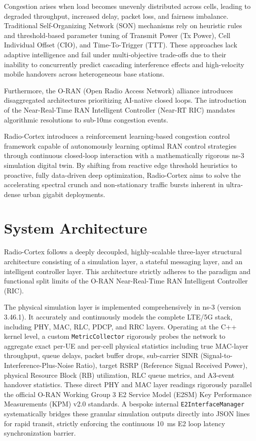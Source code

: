 \documentclass[12pt,a4paper]{article}
\begin{document}
Congestion arises when load becomes unevenly distributed across cells, leading to degraded throughput, increased delay, packet loss, and fairness imbalance. Traditional Self-Organizing Network (SON) mechanisms rely on heuristic rules and threshold-based parameter tuning of Transmit Power (Tx Power), Cell Individual Offset (CIO), and Time-To-Trigger (TTT). These approaches lack adaptive intelligence and fail under multi-objective trade-offs due to their inability to concurrently predict cascading interference effects and high-velocity mobile handovers across heterogeneous base stations. 

Furthermore, the O-RAN (Open Radio Access Network) alliance introduces disaggregated architectures prioritizing AI-native closed loops. The introduction of the Near-Real-Time RAN Intelligent Controller (Near-RT RIC) mandates algorithmic resolutions to sub-10ms congestion events. 

Radio-Cortex introduces a reinforcement learning-based congestion control framework capable of autonomously learning optimal RAN control strategies through continuous closed-loop interaction with a mathematically rigorous ns-3 simulation digital twin. By shifting from reactive edge threshold heuristics to proactive, fully data-driven deep optimization, Radio-Cortex aims to solve the accelerating spectral crunch and non-stationary traffic bursts inherent in ultra-dense urban gigabit deployments.

\section{System Architecture}

Radio-Cortex follows a deeply decoupled, highly-scalable three-layer structural architecture consisting of a simulation layer, a stateful messaging layer, and an intelligent controller layer. This architecture strictly adheres to the paradigm and functional split limits of the O-RAN Near-Real-Time RAN Intelligent Controller (RIC).

The physical simulation layer is implemented comprehensively in ns-3 (version 3.46.1). It accurately and continuously models the complete LTE/5G stack, including PHY, MAC, RLC, PDCP, and RRC layers. Operating at the C++ kernel level, a custom \texttt{MetricCollector} rigorously probes the network to aggregate exact per-UE and per-cell physical statistics including true MAC-layer throughput, queue delays, packet buffer drops, sub-carrier SINR (Signal-to-Interference-Plus-Noise Ratio), target RSRP (Reference Signal Received Power), physical Resource Block (RB) utilization, RLC queue metrics, and A3-event handover statistics. These direct PHY and MAC layer readings rigorously parallel the official O-RAN Working Group 3 E2 Service Model (E2SM) Key Performance Measurements (KPM) v2.0 standards. A bespoke internal \texttt{E2InterfaceManager} systematically bridges these granular simulation outputs directly into JSON lines for rapid transit, strictly enforcing the continuous 10~ms E2 loop latency synchronization barrier.
\end{document}
